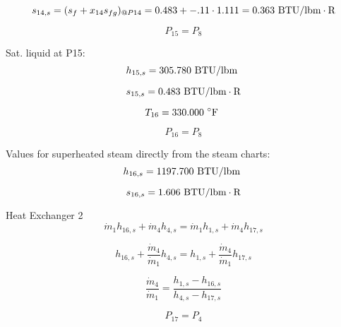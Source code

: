 \documentclass{article}
\begin{document}
\begin{equation}
  s_{14,s} = (s_{f} + x_{14}s_{fg})_{@P14} =    0.483 + -.11\cdot   1.111 =    0.363
\textnormal{ BTU/lbm}\cdot\textnormal{R}
\end{equation}

\begin{equation}
P_{15} = P_{ 8}
\end{equation}

Sat. liquid at P15:
\begin{equation}
  h_{15,s} =  305.780\textnormal{ BTU/lbm                   }
\end{equation}

\begin{equation}
  s_{15,s} =    0.483\textnormal{ BTU/lbm}\cdot\textnormal{R}
\end{equation}

\begin{equation}
T_{16} =  330.000\textnormal{ \(^{\circ}\)F             }
\end{equation}

\begin{equation}
P_{16} = P_{ 8}
\end{equation}

Values for superheated steam directly from the steam charts:
\begin{equation}
  h_{16,s} = 1197.700\textnormal{ BTU/lbm                   }
\end{equation}

\begin{equation}
  s_{16,s} =    1.606\textnormal{ BTU/lbm}\cdot\textnormal{R}
\end{equation}


Heat Exchanger 2
\begin{equation}
\dot{m}_{ 1}h_{16,s} + \dot{m}_{ 4}h_{ 4,s} = \dot{m}_{ 1}h_{ 1,s} + \dot{m}_{ 4}h_{17,s}
\end{equation}

\begin{equation}
h_{16,s} + \frac{\dot{m}_{ 4}}{\dot{m}_{ 1}}h_{ 4,s} = h_{ 1,s} + \frac{\dot{m}_{ 4}}{\dot{m}_{ 1}}h_{17,s}
\end{equation}

\begin{equation}
\frac{\dot{m}_{4}}{\dot{m}_{1}} = \frac{h_{1,s} - h_{16,s}}{h_{4,s} - h_{17,s}}
\end{equation}

\begin{equation}
P_{17} = P_{ 4}
\end{equation}
\end{document}
